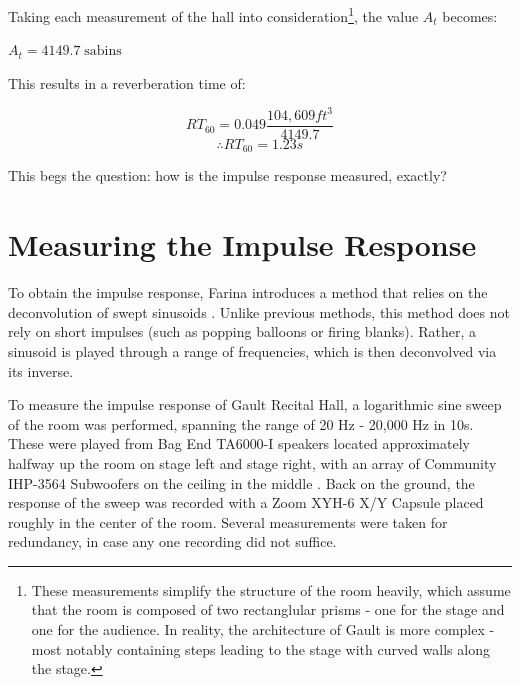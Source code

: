 Taking each measurement of the hall into consideration\footnote{These measurements simplify the structure of the room heavily, which assume that the room is composed of two rectanglular prisms - one for the stage and one for the audience. In reality, the architecture of Gault is more complex - most notably containing steps leading to the stage with curved walls along the stage.}, the value $A_t$ becomes:
\begin{center}
\end{center}
\begin{center}
  $A_t = 4149.7 \; \text{sabins}$
\end{center}

This results in a reverberation time of:

\begin{equation}
 RT_{60} = 0.049 \frac{104,609 ft^3}{4149.7}
\end{equation}
\begin{equation}
 \therefore RT_{60} = 1.23s
\end{equation}

This begs the question: how is the impulse response measured, exactly?

\section{Measuring the Impulse Response}
To obtain the impulse response, Farina introduces a method that relies on the deconvolution of swept sinusoids \cite{farina2000simultaneous}. Unlike previous methods, this method does not rely on short impulses (such as popping balloons or firing blanks). Rather, a sinusoid is played through a range of frequencies, which is then deconvolved via its inverse.

To measure the impulse response of Gault Recital Hall, a logarithmic sine sweep of the room was performed, spanning the range of 20 Hz - 20,000 Hz in 10s. These were played from Bag End TA6000-I speakers located approximately halfway up the room on stage left and stage right, with an array of Community IHP-3564 Subwoofers on the ceiling in the middle \cite{woosound}. Back on the ground, the response of the sweep was recorded with a Zoom XYH-6 X/Y Capsule placed roughly in the center of the room. Several measurements were taken for redundancy, in case any one recording did not suffice.


